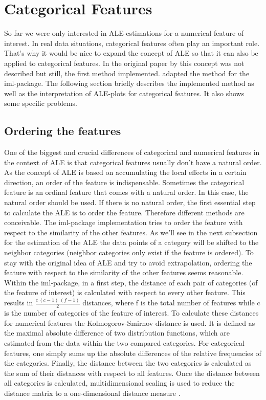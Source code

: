 \documentclass[
]{krantz}
\begin{document}
\hypertarget{categorical-features}{%
\section{Categorical Features}\label{categorical-features}}

So far we were only interested in ALE-estimations for a numerical feature of interest. In real data situations, categorical features often play an important role. That's why it would be nice to expand the concept of ALE so that it can also be applied to categorical features. In the original paper by \citep{Apley2016} this concept was not described but still, the first method implemented. \citep{molnar2019} adapted the method for the iml-package. The following section briefly describes the implemented method as well as the interpretation of ALE-plots for categorical features. It also shows some specific problems.

\hypertarget{ordering-the-features}{%
\subsection{Ordering the features}\label{ordering-the-features}}

One of the biggest and crucial differences of categorical and numerical features in the context of ALE is that categorical features usually don't have a natural order. As the concept of ALE is based on accumulating the local effects in a certain direction, an order of the feature is indispensable. Sometimes the categorical feature is an ordinal feature that comes with a natural order. In this case, the natural order should be used. If there is no natural order, the first essential step to calculate the ALE is to order the feature. Therefore different methods are conceivable. The iml-package implementation tries to order the feature with respect to the similarity of the other features. As we'll see in the next subsection for the estimation of the ALE the data points of a category will be shifted to the neighbor categories (neighbor categories only exist if the feature is ordered). To stay with the original idea of ALE and try to avoid extrapolation, ordering the feature with respect to the similarity of the other features seems reasonable. Within the iml-package, in a first step, the distance of each pair of categories (of the feature of interest) is calculated with respect to every other feature. This results in \(\frac{c~(c-1)~(f-1)}{2}\) distances, where f is the total number of features while c is the number of categories of the feature of interest. To calculate these distances for numerical features the Kolmogorov-Smirnov distance is used. It is defined as the maximal absolute difference of two distribution functions, which are estimated from the data within the two compared categories. For categorical features, one simply sums up the absolute differences of the relative frequencies of the categories.
Finally, the distance between the two categories is calculated as the sum of their distances with respect to all features.
Once the distance between all categories is calculated, multidimensional scaling is used to reduce the distance matrix to a one-dimensional distance measure \citep{molnar2019}.
\end{document}
